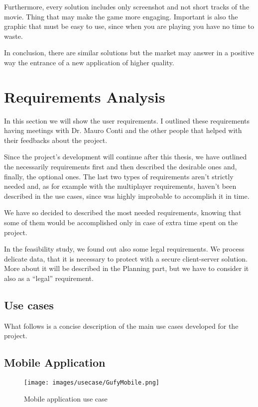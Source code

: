 Furthermore, every solution includes only screenshot and not short tracks of the movie. Thing that may make the game more engaging. Important is also the graphic that must be easy to use, since when you are playing you have no time to waste.

In conclusion, there are similar solutions but the market may answer in a positive way the entrance of a new application of higher quality.

\newpage

\section{Requirements Analysis}

In this section we will show the user requirements. I outlined these requirements having meetings with Dr. Mauro Conti and the other people that helped with their feedbacks about the project.

Since the project's development will continue after this thesis, we have outlined the necessarily requirements first and then described the desirable ones and, finally, the optional ones. The last two types of requirements aren't strictly needed and, as for example with the multiplayer requirements, haven't been described in the use cases, since was highly improbable to accomplish it in time.

We have so decided to described the most needed requirements, knowing that some of them would be accomplished only in case of extra time spent on the project.

In the feasibility study, we found out also some legal requirements. We process delicate data, that it is necessary to protect with a secure client-server solution. More about it will be described in the Planning part, but we have to consider it also as a ``legal'' requirement.

\subsection{Use cases}
What follows is a concise description of the main use cases developed for the project. 

\subsection{Mobile Application}
\begin{figure}[H]
\centering %
\texttt{[image: images/usecase/GufyMobile.png]}
\caption{Mobile application use case}
\label{fig:GufyMobile}
\end{figure}

